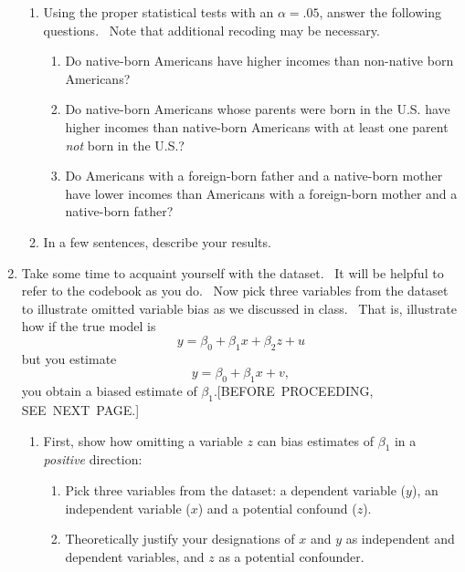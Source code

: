 \documentclass[11pt]{article}
\begin{document}
\begin{enumerate}
\begin{enumerate}
\item Using the proper statistical tests with an $\alpha =.05$, answer the
following questions. \ Note that additional recoding may be necessary.

\begin{enumerate}
\item Do native-born Americans have higher incomes than non-native born
Americans?

\item Do native-born Americans whose parents were born in the U.S. have
higher incomes than native-born Americans with at least one parent \textit{%
not }born in the U.S.?

\item Do Americans with a foreign-born father and a native-born mother have
lower incomes than Americans with a foreign-born mother and a native-born
father?\bigskip
\end{enumerate}

\item In a few sentences, describe your results. \ \texttt{\ \ }
\end{enumerate}

\item Take some time to acquaint yourself with the dataset. \ It will be
helpful to refer to the codebook as you do. \ Now pick three variables from
the dataset to illustrate omitted variable bias as we discussed in class. \
That is, illustrate how if the true model is%
\begin{equation*}
y=\beta _{0}+\beta _{1}x+\beta _{2}z+u
\end{equation*}%
but you estimate%
\begin{equation*}
y=\beta _{0}+\beta _{1}x+v,
\end{equation*}%
you obtain a biased estimate of $\beta _{1}.$[BEFORE\ PROCEEDING, SEE\ NEXT\
PAGE.]

\begin{enumerate}
\item First, show how omitting a variable $z$ can bias estimates of $\beta
_{1}$ in a \textit{positive} direction:

\begin{enumerate}
\item Pick three variables from the dataset: a dependent variable ($y$), an
independent variable ($x$) and a potential confound ($z$).

\item Theoretically justify your designations of $x$ and $y$ as independent
and dependent variables, and $z$ as a potential confounder.


\end{enumerate}
\end{enumerate}
\end{enumerate}
\end{document}
